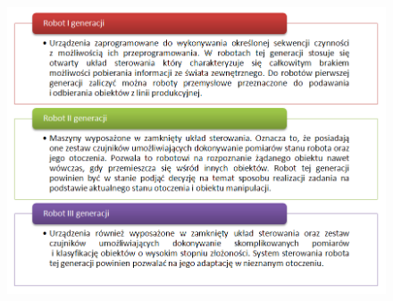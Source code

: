 \begin{figure}[hb]
 \centering
 \includegraphics[height=120mm]{../images/ch01/robot_generations.png}
 \label{fig:RobotsGenerations}
\end{figure}

